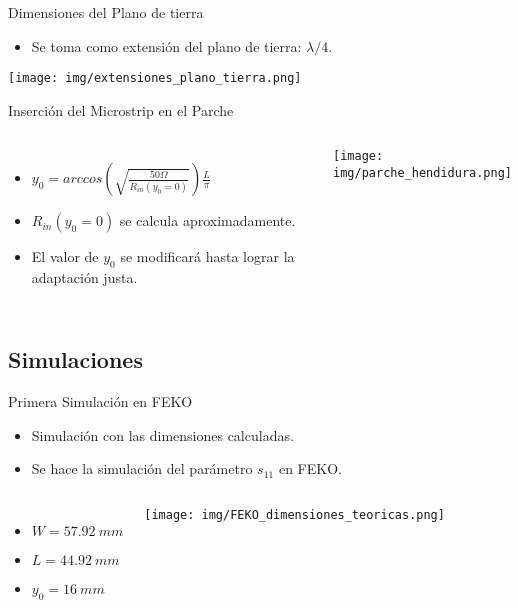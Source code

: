 \begin{frame}{Dimensiones del Plano de tierra}
    \begin{itemize}
        \item Se toma como extensión del plano de tierra: $\lambda/4$.
    \end{itemize}

    \begin{center}
        \texttt{[image: img/extensiones\_plano\_tierra.png]}
    \end{center}
\end{frame}

\begin{frame}{Inserción del Microstrip en el Parche}

\begin{columns}
        \begin{itemize}
            \item<1-> $y_0 = arccos\left( \sqrt{\frac{50 \Omega}{R_{in}(y_0 = 0)}} \right) \frac{L}{\pi}$
            \item<2-> $R_{in}(y_0 = 0)$ se calcula aproximadamente. 
            \item<3-> El valor de $y_0$ se modificará hasta lograr la adaptación justa.
        \end{itemize}
        \texttt{[image: img/parche\_hendidura.png]}
\end{columns}
\end{frame}

\subsection{Simulaciones}
\begin{frame}{Primera Simulación en FEKO}
    \begin{itemize}
        \item<1-> Simulación con las dimensiones calculadas.
        \item<2-> Se hace la simulación del parámetro $s_{11}$ en FEKO.
    \end{itemize}
    \begin{columns}
            \begin{itemize}
                \item<3-> $W = 57.92 \ mm$
                \item<3-> $L = 44.92 \ mm$
                \item<3-> $y_0 = 16 \ mm$
            \end{itemize}
            \texttt{[image: img/FEKO\_dimensiones\_teoricas.png]}
    \end{columns}
\end{frame}

